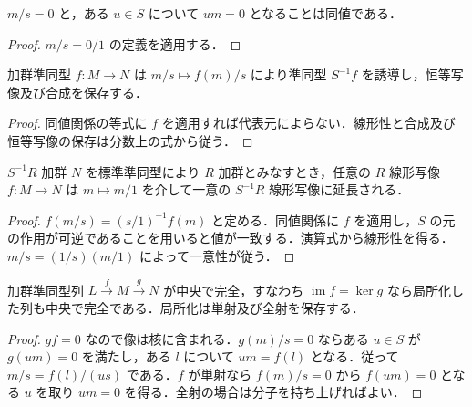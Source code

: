 \begin{prop}[局所化の零判定]
$m/s=0$ と，ある $u\in S$ について $um=0$ となることは同値である．
\end{prop}
\begin{proof}
$m/s=0/1$ の定義を適用する．
\end{proof}
\begin{prop}[局所化の函手性]
加群準同型 $f:M\to N$ は $m/s\mapsto f(m)/s$ により準同型 $S^{-1}f$ を誘導し，恒等写像及び合成を保存する．
\end{prop}
\begin{proof}
同値関係の等式に $f$ を適用すれば代表元によらない．線形性と合成及び恒等写像の保存は分数上の式から従う．
\end{proof}
\begin{prop}[加群局所化の普遍性]
$S^{-1}R$ 加群 $N$ を標準準同型により $R$ 加群とみなすとき，任意の $R$ 線形写像 $f:M\to N$ は $m\mapsto m/1$ を介して一意の $S^{-1}R$ 線形写像に延長される．
\end{prop}
\begin{proof}
$\bar f(m/s)=(s/1)^{-1}f(m)$ と定める．同値関係に $f$ を適用し，$S$ の元の作用が可逆であることを用いると値が一致する．演算式から線形性を得る．$m/s=(1/s)(m/1)$ によって一意性が従う．
\end{proof}
\begin{prop}[局所化の完全性]
加群準同型列 $L\xrightarrow f M\xrightarrow g N$ が中央で完全，すなわち $\operatorname{im}f=\ker g$ なら局所化した列も中央で完全である．局所化は単射及び全射を保存する．
\end{prop}
\begin{proof}
$gf=0$ なので像は核に含まれる．$g(m)/s=0$ ならある $u\in S$ が $g(um)=0$ を満たし，ある $l$ について $um=f(l)$ となる．従って $m/s=f(l)/(us)$ である．$f$ が単射なら $f(m)/s=0$ から $f(um)=0$ となる $u$ を取り $um=0$ を得る．全射の場合は分子を持ち上げればよい．
\end{proof}
